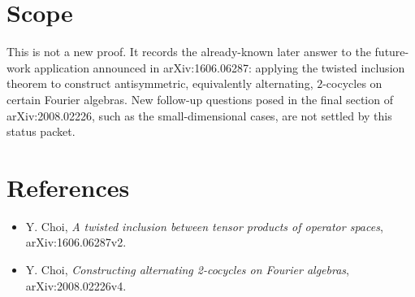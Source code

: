 \documentclass[11pt]{article}
\begin{document}
\section*{Scope}

This is not a new proof. It records the already-known later answer to the
future-work application announced in arXiv:1606.06287: applying the twisted
inclusion theorem to construct antisymmetric, equivalently alternating,
$2$-cocycles on certain Fourier algebras. New follow-up questions posed in the
final section of arXiv:2008.02226, such as the small-dimensional cases, are not
settled by this status packet.

\section*{References}

\begin{itemize}
\item Y. Choi, \emph{A twisted inclusion between tensor products of operator
spaces}, arXiv:1606.06287v2.
\item Y. Choi, \emph{Constructing alternating 2-cocycles on Fourier algebras},
arXiv:2008.02226v4.
\end{itemize}
\end{document}
